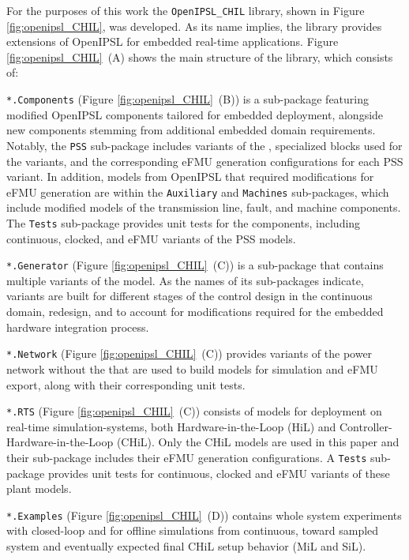For the purposes of this work the \texttt{OpenIPSL\_CHIL} library, shown in Figure \ref{fig:openipsl_CHIL}, was developed. As its name implies, the library provides extensions of OpenIPSL for embedded real-time applications. Figure \ref{fig:openipsl_CHIL}~(A) shows the main structure of the library, which consists of:

\squishlist
    \item \texttt{*.Components} (Figure \ref{fig:openipsl_CHIL}~(B)) is a sub-package featuring modified OpenIPSL components tailored for embedded deployment, alongside new components stemming from additional embedded domain requirements. Notably, the \texttt{PSS} sub-package includes variants of the \controller{}, specialized blocks used for the variants, and the corresponding eFMU generation configurations for each PSS variant. In addition, models from OpenIPSL that required modifications for eFMU generation are within the \texttt{Auxiliary} and \texttt{Machines} sub-packages, which include modified models of the transmission line, fault, and machine components. The \texttt{Tests} sub-package provides unit tests for the components, including continuous, clocked, and eFMU variants of the PSS models.
    \item \texttt{*.Generator} (Figure \ref{fig:openipsl_CHIL}~(C)) is a sub-package that contains multiple variants of the \generatorunit{} model. As the names of its sub-packages indicate, variants are built for different stages of the control design in the continuous domain, redesign, and to account for modifications required for the embedded hardware integration process.
    \item \texttt{*.Network} (Figure \ref{fig:openipsl_CHIL}~(C)) provides variants of the power network without the \generatorunit{} that are used to build models for simulation and eFMU export, along with their corresponding unit tests.
    \item \texttt{*.RTS} (Figure \ref{fig:openipsl_CHIL}~(C)) consists of \plant{} models for deployment on real-time simulation-systems, both Hardware-in-the-Loop (HiL) and Controller-Hardware-in-the-Loop (CHiL). Only the CHiL \plant{} models are used in this paper and their sub-package includes their eFMU generation configurations. A \texttt{Tests} sub-package provides unit tests for continuous, clocked and eFMU variants of these plant models.
    \item \texttt{*.Examples} (Figure \ref{fig:openipsl_CHIL}~(D)) contains whole system experiments with closed-loop \controller{} and \plant{} for offline simulations from continuous, toward sampled system and eventually expected final CHiL setup behavior (MiL and SiL).
\squishend

